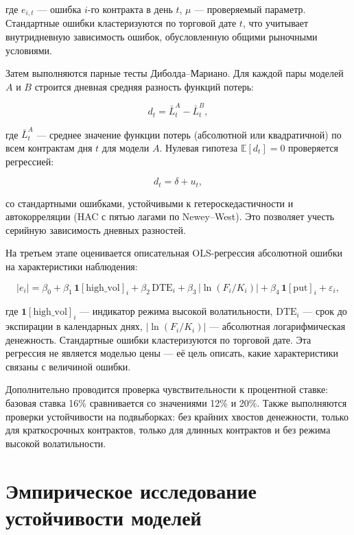 \documentclass[11pt,a4paper]{article}
\begin{document}
где $e_{i,t}$ --- ошибка $i$-го контракта в день $t$, $\mu$ --- проверяемый параметр. Стандартные ошибки кластеризуются по торговой дате $t$, что учитывает внутридневную зависимость ошибок, обусловленную общими рыночными условиями.

Затем выполняются парные тесты Диболда--Мариано. Для каждой пары моделей $A$ и $B$ строится дневная средняя разность функций потерь:

\begin{equation}
d_t = \bar{L}^{A}_{t} - \bar{L}^{B}_{t},
\end{equation}

где $\bar{L}^{A}_{t}$ --- среднее значение функции потерь (абсолютной или квадратичной) по всем контрактам дня $t$ для модели $A$. Нулевая гипотеза $\mathbb{E}[d_t] = 0$ проверяется регрессией:

\begin{equation}
d_t = \delta + u_t,
\end{equation}

со стандартными ошибками, устойчивыми к гетероскедастичности и автокорреляции (HAC с пятью лагами по Newey--West). Это позволяет учесть серийную зависимость дневных разностей.

На третьем этапе оценивается описательная OLS-регрессия абсолютной ошибки на характеристики наблюдения:

\begin{equation}
|e_i| = \beta_0
        + \beta_1\,\mathbf{1}[\text{high\_vol}]_i
        + \beta_2\,\mathrm{DTE}_i
        + \beta_3\,\bigl|\ln(F_i/K_i)\bigr|
        + \beta_4\,\mathbf{1}[\text{put}]_i
        + \varepsilon_i,
\end{equation}

где $\mathbf{1}[\text{high\_vol}]_i$ --- индикатор режима высокой волатильности, $\mathrm{DTE}_i$ --- срок до экспирации в календарных днях, $|\ln(F_i/K_i)|$ --- абсолютная логарифмическая денежность. Стандартные ошибки кластеризуются по торговой дате. Эта регрессия не является моделью цены --- её цель описать, какие характеристики связаны с величиной ошибки.

Дополнительно проводится проверка чувствительности к процентной ставке: базовая ставка 16\% сравнивается со значениями 12\% и 20\%. Также выполняются проверки устойчивости на подвыборках: без крайних хвостов денежности, только для краткосрочных контрактов, только для длинных контрактов и без режима высокой волатильности.

\section{Эмпирическое исследование устойчивости моделей}
\end{document}
